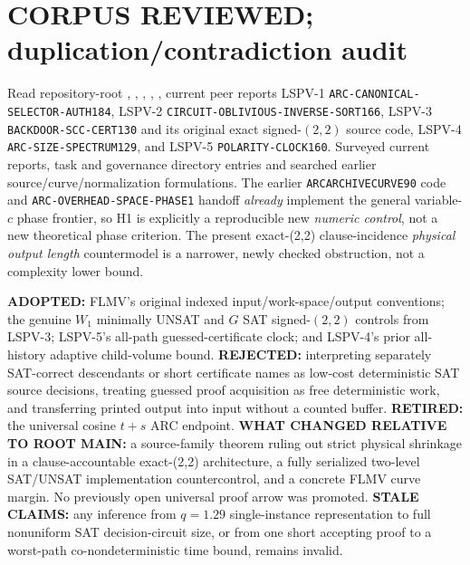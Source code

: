 \documentclass[11pt]{article}
\begin{document}
\section{CORPUS REVIEWED; duplication/contradiction audit}
Read repository-root , , , , , current peer reports LSPV-1 \texttt{ARC-CANONICAL-SELECTOR-AUTH184}, LSPV-2 \texttt{CIRCUIT-OBLIVIOUS-INVERSE-SORT166}, LSPV-3 \texttt{BACKDOOR-SCC-CERT130} and its original exact signed-$(2,2)$ source code, LSPV-4 \texttt{ARC-SIZE-SPECTRUM129}, and LSPV-5 \texttt{POLARITY-CLOCK160}. Surveyed current reports, task and governance directory entries and searched earlier source/curve/normalization formulations. The earlier \texttt{ARCARCHIVECURVE90} code and \texttt{ARC-OVERHEAD-SPACE-PHASE1} handoff \emph{already} implement the general variable-$c$ phase frontier, so H1 is explicitly a reproducible new \emph{numeric control}, not a new theoretical phase criterion. The present exact-(2,2) clause-incidence \emph{physical output length} countermodel is a narrower, newly checked obstruction, not a complexity lower bound.

\textbf{ADOPTED:} FLMV's original indexed input/work-space/output conventions; the genuine $W_1$ minimally UNSAT and $G$ SAT signed-$(2,2)$ controls from LSPV-3; LSPV-5's all-path guessed-certificate clock; and LSPV-4's prior all-history adaptive child-volume bound. \textbf{REJECTED:} interpreting separately SAT-correct descendants or short certificate names as low-cost deterministic SAT source decisions, treating guessed proof acquisition as free deterministic work, and transferring printed output into input without a counted buffer. \textbf{RETIRED:} the universal cosine $t+s$ ARC endpoint. \textbf{WHAT CHANGED RELATIVE TO ROOT MAIN:} a source-family theorem ruling out strict physical shrinkage in a clause-accountable exact-(2,2) architecture, a fully serialized two-level SAT/UNSAT implementation countercontrol, and a concrete FLMV curve margin. No previously open universal proof arrow was promoted. \textbf{STALE CLAIMS:} any inference from $q=1.29$ single-instance representation to full nonuniform SAT decision-circuit size, or from one short accepting proof to a worst-path co-nondeterministic time bound, remains invalid.
\end{document}

